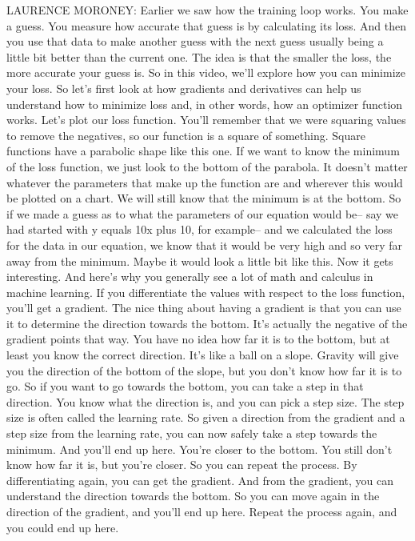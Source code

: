 LAURENCE MORONEY: Earlier we saw how the training loop works.
You make a guess.
You measure how accurate that guess is by calculating its loss.
And then you use that data to make another guess
with the next guess usually being a little bit better than the current one.
The idea is that the smaller the loss, the more accurate your guess is.
So in this video, we'll explore how you can minimize your loss.
So let's first look at how gradients and derivatives can help us
understand how to minimize loss and, in other words, how
an optimizer function works.
Let's plot our loss function.
You'll remember that we were squaring values to remove the negatives,
so our function is a square of something.
Square functions have a parabolic shape like this one.
If we want to know the minimum of the loss function,
we just look to the bottom of the parabola.
It doesn't matter whatever the parameters that make up the function
are and wherever this would be plotted on a chart.
We will still know that the minimum is at the bottom.
So if we made a guess as to what the parameters of our equation would be--
say we had started with y equals 10x plus 10, for example--
and we calculated the loss for the data in our equation,
we know that it would be very high and so very far away from the minimum.
Maybe it would look a little bit like this.
Now it gets interesting.
And here's why you generally see a lot of math and calculus
in machine learning.
If you differentiate the values with respect to the loss function,
you'll get a gradient.
The nice thing about having a gradient is
that you can use it to determine the direction towards the bottom.
It's actually the negative of the gradient points that way.
You have no idea how far it is to the bottom,
but at least you know the correct direction.
It's like a ball on a slope.
Gravity will give you the direction of the bottom of the slope,
but you don't know how far it is to go.
So if you want to go towards the bottom, you can take a step in that direction.
You know what the direction is, and you can pick a step size.
The step size is often called the learning rate.
So given a direction from the gradient and a step size from the learning rate,
you can now safely take a step towards the minimum.
And you'll end up here.
You're closer to the bottom.
You still don't know how far it is, but you're closer.
So you can repeat the process.
By differentiating again, you can get the gradient.
And from the gradient, you can understand
the direction towards the bottom.
So you can move again in the direction of the gradient,
and you'll end up here.
Repeat the process again, and you could end up here.
